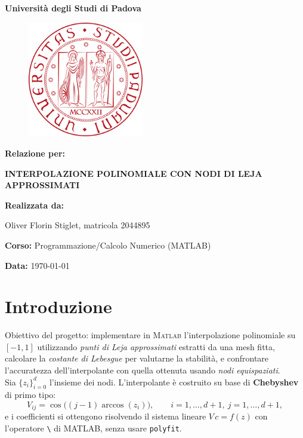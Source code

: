 \documentclass[12pt]{article}
\begin{document}
\begin{titlepage}
  \centering
  {\Huge \textbf{Università degli Studi di Padova}\par}
  \vspace{1cm}
  \begin{figure}[htbp!]
    \centering
    \includegraphics[width=0.45\textwidth]{logo_unipd.png}
  \end{figure}
  \vspace{1.5cm}
  {\LARGE \textbf{Relazione per:}\par}
  {\Huge \textbf{INTERPOLAZIONE POLINOMIALE CON NODI DI LEJA\\APPROSSIMATI}\par}
  \vfill
  \textbf{Realizzata da:}\par
  Oliver Florin Stiglet, matricola 2044895\par
  \vspace{0.5cm}
  \textbf{Corso:} Programmazione/Calcolo Numerico (MATLAB)\par
  \vspace{0.2cm}
  \textbf{Data:} \today
\end{titlepage}

\renewcommand{\familydefault}{\sfdefault}
\fontsize{10}{12}\selectfont

\section{Introduzione}
Obiettivo del progetto: implementare in \textsc{Matlab} l'interpolazione polinomiale su \([{-}1,1]\) utilizzando \emph{punti di Leja approssimati} estratti da una mesh fitta, calcolare la \emph{costante di Lebesgue} per valutarne la stabilità, e confrontare l'accuratezza dell'interpolante con quella ottenuta usando \emph{nodi equispaziati}.\\[2mm]
Sia \(\{z_i\}_{i=0}^d\) l'insieme dei nodi. L'interpolante è costruito su base di \textbf{Chebyshev} di primo tipo:
\[
V_{ij}=\cos\!\big((j{-}1)\arccos(z_i)\big),\qquad i=1,\dots,d{+}1,\ j=1,\dots,d{+}1,
\]
e i coefficienti si ottengono risolvendo il sistema lineare \(V\,c=f(z)\) con l'operatore \verb|\| di MATLAB, senza usare \verb|polyfit|.
\end{document}
